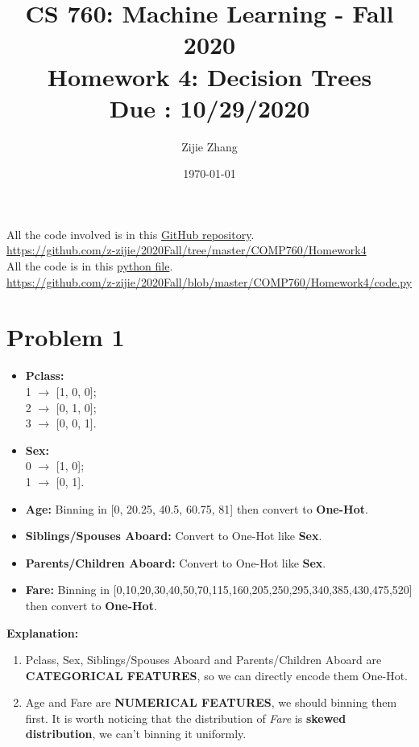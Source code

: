 \documentclass{article}
\title{CS 760: Machine Learning - Fall 2020\\
        {\Large \textbf{Homework 4: Decision Trees}}\\
        {\normalsize \textbf{Due : 10/29/2020}}
    }
\author{Zijie Zhang}
\date{\today}
\begin{document}
    \maketitle
    
\begin{center}
    \Large
    All the code involved is in this \href{https://github.com/z-zijie/2020Fall/tree/master/COMP760/Homework4}{GitHub repository}.\\
    \url{https://github.com/z-zijie/2020Fall/tree/master/COMP760/Homework4}\\
    All the code is in this \href{https://github.com/z-zijie/2020Fall/blob/master/COMP760/Homework4/code.py}{python file}.\\
    \large
    \url{https://github.com/z-zijie/2020Fall/blob/master/COMP760/Homework4/code.py}
\end{center}

\section*{Problem 1}
    \begin{itemize}
        \item \textbf{Pclass:}\\
        1 $\to$ [1, 0, 0];\\
        2 $\to$ [0, 1, 0];\\
        3 $\to$ [0, 0, 1].
        \item \textbf{Sex:}\\
        0 $\to$ [1, 0];\\
        1 $\to$ [0, 1].
        \item \textbf{Age:} Binning in [0, 20.25, 40.5, 60.75, 81] then convert to \textbf{One-Hot}.
        \item \textbf{Siblings/Spouses Aboard:} Convert to One-Hot like \textbf{Sex}.
        \item \textbf{Parents/Children Aboard:} Convert to One-Hot like \textbf{Sex}.
        \item \textbf{Fare:} Binning in [0,10,20,30,40,50,70,115,160,205,250,295,340,385,430,475,520] then convert to \textbf{One-Hot}.
    \end{itemize}
    \textbf{Explanation:}
    \begin{enumerate}
        \item Pclass, Sex, Siblings/Spouses Aboard and Parents/Children Aboard are \textbf{CATEGORICAL FEATURES}, so we can directly encode them One-Hot.
        \item Age and Fare are \textbf{NUMERICAL FEATURES}, we should binning them first. It is worth noticing that the distribution of \textit{Fare} is \textbf{skewed distribution}, we can't binning it uniformly.
    \end{enumerate}
\end{document}
